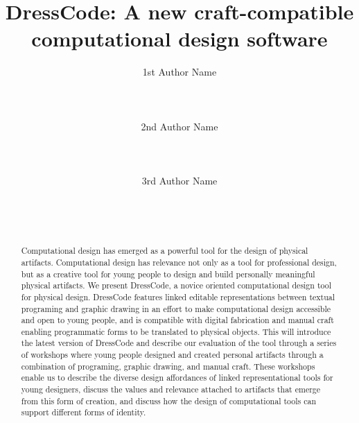 \documentclass{sigchi}
\begin{document}
\title{DressCode: A new craft-compatible computational design software}

\author{
 \alignauthor 1st Author Name\\
 \\
 \\
 \\
 \alignauthor 2nd Author Name\\
 \\
 \\
 \\
 \alignauthor 3rd Author Name\\
 \\
 \\
 \\
}

\maketitle

\begin{abstract}
Computational design has emerged as a powerful tool for the design of physical artifacts. Computational design has relevance not only as a tool for professional design, but as a creative tool for young people to design and build personally meaningful physical artifacts. We present DressCode, a novice oriented computational design tool for physical design. DressCode features linked editable representations between textual programing and graphic drawing in an effort to make computational design accessible and open to young people, and is compatible with digital fabrication and manual craft enabling programmatic forms to be translated to physical objects. This will introduce the latest version of DressCode and describe our evaluation of the tool through a series of workshops where young people designed and created personal artifacts through a combination of programing, graphic drawing, and manual craft. These workshops enable us to describe the diverse design affordances of linked representational tools for young designers, discuss the values and relevance attached to artifacts that emerge from this form of creation, and discuss how the design of computational tools can support different forms of identity.
\end{abstract}

\end{document}
